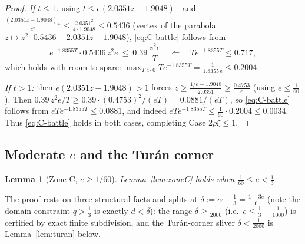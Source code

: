 \documentclass[11pt]{article}
\newtheorem{lemma}[theorem]{Lemma}
\begin{document}
\begin{proof}
\emph{If $t\le1$:} using $t\le e(2.0351z-1.9048)_+$ and
$\frac{(2.0351z-1.9048)_+}{z^2}\le\frac{2.0351^2}{4\cdot1.9048}\le0.5436$
(vertex of the parabola $z\mapsto z^2\cdot0.5436-2.0351z+1.9048$),
\eqref{eq:C-battle} follows from
\[
        e^{-1.8355T}\cdot0.5436\,z^2e\ \le\ 0.39\,\frac{z^2e}{T}
        \quad\Longleftarrow\quad
        Te^{-1.8355T}\le0.717,
\]
which holds with room to spare:
$\max_{T>0}Te^{-1.8355T}=\tfrac1{1.8355\,\mathrm e}\le0.2004$.

\emph{If $t>1$:} then $e(2.0351z-1.9048)>1$ forces
$z\ge\frac{1/e-1.9048}{2.0351}\ge\frac{0.4753}{e}$ (using $e\le\tfrac1{60}$).
Then $0.39\,z^2e/T\ge0.39\cdot(0.4753)^2/(eT)=0.0881/(eT)$, so
\eqref{eq:C-battle} follows from $eTe^{-1.8355T}\le0.0881$, and indeed
$eTe^{-1.8355T}\le\tfrac1{60}\cdot0.2004\le0.0034$.
Thus \eqref{eq:C-battle} holds in both cases, completing Case
$2\rho\xi\le1$.
\end{proof}

\subsection{Moderate $e$ and the Tur\'an corner}\label{subsec:zoneC-mod}

\begin{lemma}[Zone C, $e\ge1/60$]\label{lem:zoneC-mod}
Lemma~\ref{lem:zoneC} holds when $\tfrac1{60}\le e<\tfrac13$.
\end{lemma}

The proof rests on three structural facts and splits at
$\delta:=\alpha-\tfrac13=\tfrac{1-3e}6$ (note the domain constraint $q>\tfrac13$
is exactly $d<\delta$): the range $\delta\ge\tfrac1{2000}$ (i.e.\
$e\le\tfrac13-\tfrac1{1000}$) is certified by exact finite subdivision, and the
Tur\'an-corner sliver $\delta<\tfrac1{2000}$ is Lemma~\ref{lem:turan} below.
\end{document}
